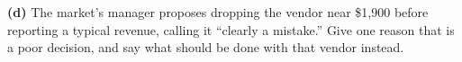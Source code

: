 \documentclass[12pt]{article}
\begin{document}
\begin{enumerate}[leftmargin=1.9em, itemsep=0.16in, resume]
        \boxguard[15]
        \vspace{6pt}
        \textbf{(d)} The market's manager proposes dropping the vendor near \$1{,}900 before
        reporting a typical revenue, calling it ``clearly a mistake.'' Give one reason that is a
        poor decision, and say what should be done with that vendor instead.\\[4pt]

\end{enumerate}
\end{document}
